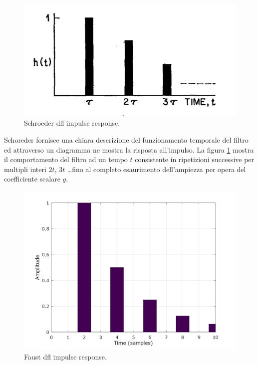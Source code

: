 \begin{refsection}
\begin{figure}[ht]
  \centering
  \includegraphics[width=\textwidth]{CAPITOLI/0500/IMG/dfl-ir.png}
  \caption[]{Schroeder dfl impulse response.}
  \label{schroeder:dflir}
\end{figure}

Schoreder fornisce una chiara descrizione del funzionamento temporale del filtro
ed attraverso un diagramma ne mostra la risposta all'impulso. La figura
\ref{schroeder:dflir} mostra il comportamento del filtro ad un tempo $t$
consistente in ripetizioni successive per multipli interi $2t$, $3t$ \ldots fino
al completo esaurimento dell'ampiezza per opera del coefficiente scalare $g$.

\begin{figure}[ht]
  \centering
  \includegraphics[width=\textwidth]{CAPITOLI/0500/CODES/REV/dfl.png}
  \caption[]{Faust dfl impulse response.}
  \label{faust:dflir}
\end{figure}


\end{refsection}
